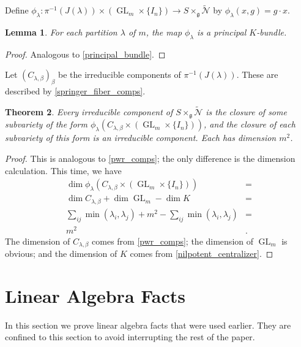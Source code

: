 \documentclass[12pt,psamsfonts]{article}
\DeclareMathOperator{\GL}{GL}
\newtheorem{theorem}{Theorem}[section]
\newtheorem{lemma}[theorem]{Lemma}
\begin{document}
Define \(\phi_\lambda : \pi^{-1}(J(\lambda)) \times (\GL_m \times \{I_n\}) \to S \times_\mathfrak{g} \widetilde{\mathcal{N}}\) by \(\phi_\lambda(x, g) = g \cdot x\).

\begin{lemma}\label{principal_bundle_two}
    For each partition \(\lambda\) of \(m\), the map \(\phi_\lambda\) is a principal \(K\)-bundle.
\end{lemma}
\begin{proof}
    Analogous to \cref{principal_bundle}.
\end{proof}

Let \((C_{\lambda, \beta})_\beta\) be the irreducible components of \(\pi^{-1}(J(\lambda))\).
These are described by \cref{springer_fiber_comps}.

\begin{theorem}
    Every irreducible component of \(S \times_\mathfrak{g} \widetilde{\mathcal{N}}\) is the closure of some subvariety of the form \(\phi_\lambda(C_{\lambda,\beta} \times (\GL_m \times \{I_n\}))\), and the closure of each subvariety of this form is an irreducible component.
    Each has dimension \(m^2\).
\end{theorem}
\begin{proof}
    This is analogous to \cref{pwr_comps}; the only difference is the dimension calculation.
    This time, we have 
    \begin{align*}
        \dim \phi_\lambda(C_{\lambda, \beta} \times (\GL_m \times \{I_n\})) & = \\
        \dim C_{\lambda,\beta} + \dim \GL_m - \dim K & = \\
        \sum_{ij} \min(\lambda_i, \lambda_j) + m^2 - \sum_{ij} \min(\lambda_i, \lambda_j) & = \\
        m^2 & .
    \end{align*}
    The dimension of \(C_{\lambda, \beta}\) comes from \cref{pwr_comps}; the dimension of \(\GL_m\) is obvious; and the dimension of \(K\) comes from \cref{nilpotent_centralizer}.
\end{proof}

\section{Linear Algebra Facts}\label{linalg}
In this section we prove linear algebra facts that were used earlier.
They are confined to this section to avoid interrupting the rest of the paper.
\end{document}
